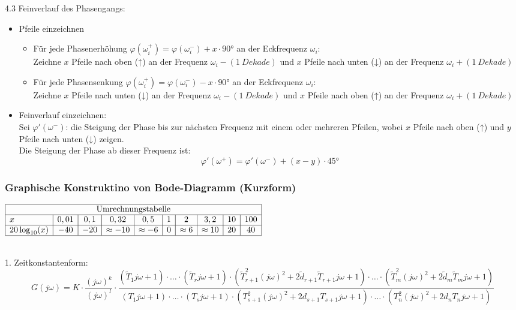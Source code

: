 \documentclass[10pt,a4paper]{article}
\begin{document}
4.3 Feinverlauf des Phasengangs:
\begin{itemize}
	\item Pfeile einzeichnen
	\begin{itemize}
		\item Für jede Phasenerhöhung $\varphi(\omega_i^+) = \varphi(\omega_i^-) + x ⋅ 90°$ an der Eckfrequenz $\omega_i$: \\
		Zeichne $x$ Pfeile nach oben (↑) an der Frequenz $\omega_i - (1 ~Dekade)$ und $x$ Pfeile nach unten (↓) an der Frequenz $\omega_i + (1 ~Dekade)$
		\item Für jede Phasensenkung $\varphi(\omega_i^+) = \varphi(\omega_i^-) - x ⋅ 90°$ an der Eckfrequenz $\omega_i$: \\
		Zeichne $x$ Pfeile nach unten (↓) an der Frequenz $\omega_i - (1 ~Dekade)$ und $x$ Pfeile nach oben (↑) an der Frequenz $\omega_i + (1 ~Dekade)$
	\end{itemize}
	\item Feinverlauf einzeichnen: \\
	Sei $\varphi'(\omega^-)$: die Steigung der Phase bis zur nächsten Frequenz mit einem oder mehreren Pfeilen, wobei $x$ Pfeile nach oben (↑) und $y$ Pfeile nach unten (↓) zeigen. \\
	Die Steigung der Phase ab dieser Frequenz ist:
	$$
		\varphi'(\omega^+) = \varphi'(\omega^-) + (x - y) ⋅ 45°
	$$
\end{itemize}

\subsubsection{Graphische Konstruktino von Bode-Diagramm (Kurzform)}
\begin{center}
	$\begin{array}{|l|c|c|c|c|c|c|c|c|c|}
	\hline
	\multicolumn{10}{|c|}{\text{Umrechnungstabelle}} \\
	\hline
	x & 0,01 & 0,1 & 0,32 & 0,5 & 1 & 2 & 3,2 & 10 & 100 \\
	\hline
	20 \log_{10}(x) & -40 & -20 & \approx -10 & \approx -6 & 0 & \approx 6 & \approx 10 & 20 & 40 \\
	\hline
	\end{array}$
\end{center} ~\\

1. Zeitkonstantenform:
$$
	G(j \omega) = K ⋅ \frac{(j \omega)^k}{(j \omega)^l} ⋅ \frac{(\tilde T_1 j \omega + 1) ⋅ \dots ⋅ (\tilde T_r j \omega + 1) ⋅ (\tilde T_{r+1}^2 (j \omega)^2 + 2\tilde d_{r+1} \tilde T_{r+1} j \omega + 1) ⋅ \dots ⋅ (\tilde T_m^2 (j \omega)^2 + 2\tilde d_m \tilde T_m j \omega + 1)}{(T_1 j \omega + 1) ⋅ \dots ⋅ (T_s j \omega + 1) ⋅ (T_{s+1}^2 (j \omega)^2 + 2 d_{s+1} T_{s+1} j \omega + 1) ⋅ \dots ⋅ (T_n^2 (j \omega)^2 + 2 d_n T_n j \omega + 1)}
$$
\end{document}
